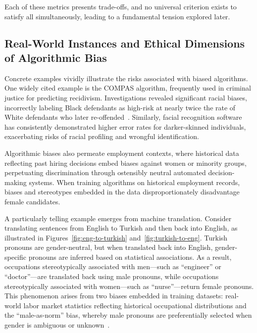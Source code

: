 Each of these metrics presents trade-offs, and no universal criterion
exists to satisfy all simultaneously,
leading to a fundamental tension explored later.

\subsection{Real-World Instances and Ethical Dimensions of
Algorithmic Bias}\label{subsec:real_world_bias}

Concrete examples vividly illustrate the risks associated with biased
algorithms. One widely cited example is the COMPAS algorithm,
frequently used in criminal justice for predicting recidivism.
Investigations revealed significant racial biases, incorrectly
labeling Black defendants as high-risk at nearly twice the rate of
White defendants who later re-offended~\cite{angwin2016machine}.
Similarly, facial recognition software has consistently demonstrated
higher error rates for darker-skinned individuals, exacerbating risks
of racial profiling and wrongful identification.

Algorithmic biases also permeate employment contexts, where
historical data reflecting past hiring decisions embed biases against
women or minority groups, perpetuating discrimination through
ostensibly neutral automated decision-making systems. When training
algorithms on historical employment records, biases and stereotypes
embedded in the data disproportionately disadvantage female candidates.

A particularly telling example emerges from machine translation.
Consider translating sentences from English to Turkish and then back
into English, as illustrated in Figures~\ref{fig:eng-to-turkish}
and~\ref{fig:turkish-to-eng}. Turkish pronouns are gender-neutral,
but when translated back into English, gender-specific pronouns are
inferred based on statistical associations. As a result, occupations
stereotypically associated with men—such as ``engineer'' or
``doctor''—are translated back using male pronouns, while occupations
stereotypically associated with women—such as ``nurse''—return female
pronouns. This phenomenon arises from two biases embedded in training
datasets: real-world labor market statistics reflecting historical
occupational distributions and the ``male-as-norm'' bias, whereby
male pronouns are preferentially selected when gender is ambiguous or
unknown~\cite{caliskan2017semantics}.

